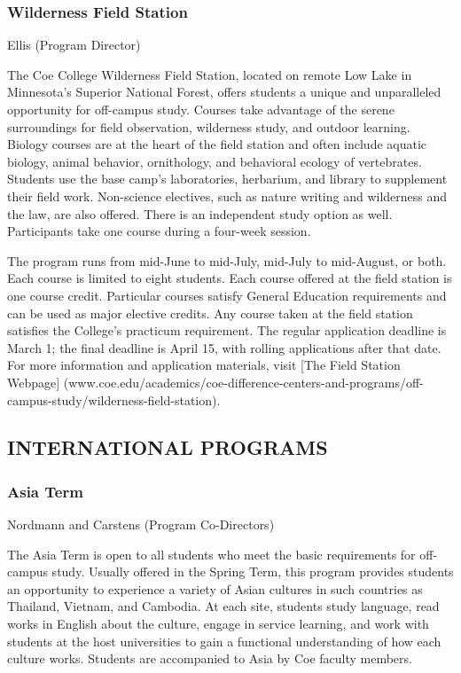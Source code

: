 \documentclass[
  letterpaper,
]{scrbook}
\begin{document}
\subsubsection{Wilderness Field Station}\label{wilderness-field-station}

Ellis (Program Director)

The Coe College Wilderness Field Station, located on remote Low Lake in
Minnesota's Superior National Forest, offers students a unique and
unparalleled opportunity for off-campus study. Courses take advantage of
the serene surroundings for field observation, wilderness study, and
outdoor learning. Biology courses are at the heart of the field station
and often include aquatic biology, animal behavior, ornithology, and
behavioral ecology of vertebrates. Students use the base camp's
laboratories, herbarium, and library to supplement their field work.
Non-science electives, such as nature writing and wilderness and the
law, are also offered. There is an independent study option as well.
Participants take one course during a four-week session.

The program runs from mid-June to mid-July, mid-July to mid-August, or
both. Each course is limited to eight students. Each course offered at
the field station is one course credit. Particular courses satisfy
General Education requirements and can be used as major elective
credits. Any course taken at the field station satisfies the College's
practicum requirement. The regular application deadline is March 1; the
final deadline is April 15, with rolling applications after that date.
For more information and application materials, visit {[}The Field
Station Webpage{]}
(www.coe.edu/academics/coe-difference-centers-and-programs/off-campus-study/wilderness-field-station).

\subsection{INTERNATIONAL PROGRAMS}\label{international-programs}

\subsubsection{Asia Term}\label{asia-term}

Nordmann and Carstens (Program Co-Directors)

The Asia Term is open to all students who meet the basic requirements
for off-campus study. Usually offered in the Spring Term, this program
provides students an opportunity to experience a variety of Asian
cultures in such countries as Thailand, Vietnam, and Cambodia. At each
site, students study language, read works in English about the culture,
engage in service learning, and work with students at the host
universities to gain a functional understanding of how each culture
works. Students are accompanied to Asia by Coe faculty members.
\end{document}
